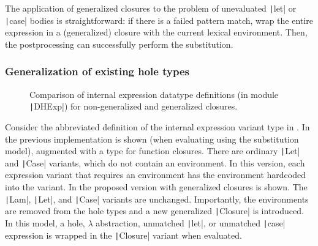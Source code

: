 The application of generalized closures to the problem of unevaluated \texttt|let| or \texttt|case| bodies is straightforward: if there is a failed pattern match, wrap the entire expression in a (generalized) closure with the current lexical environment. Then, the postprocessing can successfully perform the substitution.

\subsubsection{Generalization of existing hole types}
\label{sec:generalized-closures-datatypes}

\begin{figure}
  \centering
  \begin{singlespace}
  \end{singlespace}
  \caption{Comparison of internal expression datatype definitions (in module \texttt|DHExp|) for non-generalized and generalized closures.}
  \label{fig:generalized-closures-datatypes}
\end{figure}

Consider the abbreviated definition of the internal expression variant type in . In  the previous implementation is shown (when evaluating using the substitution model), augmented with a type for function closures. There are ordinary \texttt|Let| and \texttt|Case| variants, which do not contain an environment. In this version, each expression variant that requires an environment has the environment hardcoded into the variant. In  the proposed version with generalized closures is shown. The \texttt|Lam|, \texttt|Let|, and \texttt|Case| variants are unchanged. Importantly, the environments are removed from the hole types and a new generalized \texttt|Closure| is introduced. In this model, a hole, $\lambda$ abstraction, unmatched \texttt|let|, or unmatched \texttt|case| expression is wrapped in the \texttt|Closure| variant when evaluated.

